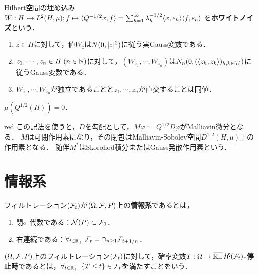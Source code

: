 \documentclass[uplatex,dvipdfmx]{jsreport}
\begin{document}
\begin{definition}\label{def-white-noise-1}
    Hilbert空間の埋め込み$W:H\hookrightarrow L^2(H,\mu);f\mapsto \langle Q^{-1/2}x,f\rangle=\sum_{h=1}^\infty\lambda_h^{-1/2}\langle x,e_h\rangle\langle f,e_h\rangle$
    を\textbf{ホワイトノイズ}という．
\end{definition}

\begin{proposition}\mbox{}\label{prop-property-of-white-noise}
    \begin{enumerate}
        \item $z\in H$に対して，値$W_z$は$N(0,\lvert z\rvert^2)$に従う実Gauss変数である．
        \item $z_1,\cdots,z_n\in H\;(n\in\mathbb{N})$に対して，$(W_{z_1},\cdots,W_{z_n})$は$N_n(0,(\langle z_h,z_k\rangle)_{h,k\in[n]})$に従うGauss変数である．
        \item $W_{z_1},\cdots,W_{z_n}$が独立であることと$z_1,\cdots,z_n$が直交することは同値．
    \end{enumerate}
\end{proposition}

\begin{proposition}
    $\mu(Q^{1/2}(H))=0$．
\end{proposition}

\begin{tbox}{red}{}
    この記法を使うと，$D$を勾配として，$M\varphi:=Q^{1/2}D\varphi$がMalliavin微分となる．
    $M$は可閉作用素になり，その閉包はMalliavin-Sobolev空間$D^{1,2}(H,\mu)$上の作用素となる．
    随伴$M^*$はSkorohod積分またはGauss発散作用素という．
\end{tbox}

\section{情報系}

\begin{definition}
    フィルトレーション$(\mathcal{F}_t)$が$(\Omega,\mathcal{F},P)$上の\textbf{情報系}であるとは，
    \begin{enumerate}
        \item 閉$\sigma$-代数である：$\mathcal{N}(P)\subset\mathcal{F}_0$．
        \item 右連続である：$\forall_{t\in\mathbb{R}_+}\;\mathcal{F}_t=\cap_{n\ge1}\mathcal{F}_{t+1/n}$．
    \end{enumerate}
\end{definition}

\begin{definition}
    $(\Omega,\mathcal{F},P)$上のフィルトレーション$(\mathcal{F}_t)$に対して，確率変数$T:\Omega\to\overline{\mathbb{R}_+}$が\textbf{$(\mathcal{F}_t)$-停止時}であるとは，$\forall_{t\in\mathbb{R}_+}\;\left\{T\le t\right\}\in\mathcal{F}_t$を満たすことをいう．
\end{definition}
\end{document}
